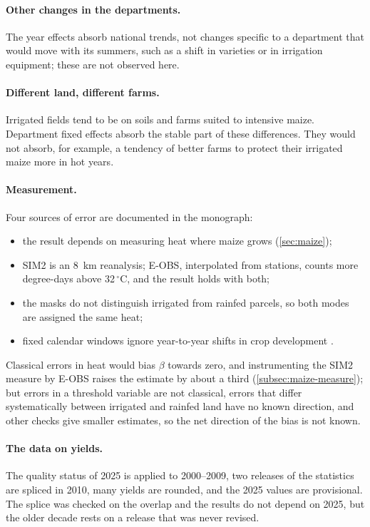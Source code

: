 \paragraph{Other changes in the departments.} The year effects absorb national trends, not changes specific to a department that would move with its summers, such as a shift in varieties or in irrigation equipment; these are not observed here.

\paragraph{Different land, different farms.} Irrigated fields tend to be on soils and farms suited to intensive maize. Department fixed effects absorb the stable part of these differences. They would not absorb, for example, a tendency of better farms to protect their irrigated maize more in hot years.

\paragraph{Measurement.} Four sources of error are documented in the monograph:
\begin{itemize}
  \item the result depends on measuring heat where maize grows (\cref{sec:maize});
  \item SIM2 is an 8~km reanalysis; E-OBS, interpolated from stations, counts more degree-days above 32\,$^{\circ}$C, and the result holds with both;
  \item the masks do not distinguish irrigated from rainfed parcels, so both modes are assigned the same heat;
  \item fixed calendar windows ignore year-to-year shifts in crop development \parencite{leroux2024}.
\end{itemize}
Classical errors in heat would bias $\beta$ towards zero, and instrumenting the SIM2 measure by E-OBS raises the estimate by about a third (\cref{subsec:maize-measure}); but errors in a threshold variable are not classical, errors that differ systematically between irrigated and rainfed land have no known direction, and other checks give smaller estimates, so the net direction of the bias is not known.

\paragraph{The data on yields.} The quality status of 2025 is applied to 2000--2009, two releases of the statistics are spliced in 2010, many yields are rounded, and the 2025 values are provisional. The splice was checked on the overlap and the results do not depend on 2025, but the older decade rests on a release that was never revised.

